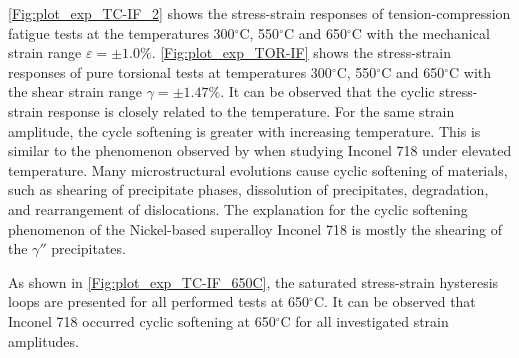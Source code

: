\ref{Fig:plot_exp_TC-IF_2} shows the stress-strain responses of tension-compression fatigue tests at the temperatures 300$^\circ$C, 550$^\circ$C and 650$^\circ$C with the mechanical strain range $\varepsilon=\pm1.0\%$. \ref{Fig:plot_exp_TOR-IF} shows the stress-strain responses of pure torsional tests at temperatures 300$^\circ$C, 550$^\circ$C and 650$^\circ$C with the shear strain range $\gamma=\pm1.47\%$. It can be observed that the cyclic stress-strain response is closely related to the temperature. For the same strain amplitude, the cycle softening is greater with increasing temperature. This is similar to the phenomenon observed by \cite{Fournier1977, Xiao2005,kim1988elevated, Schlesinger2017} when studying Inconel 718 under elevated temperature.
Many microstructural evolutions cause cyclic softening of materials, such as shearing of precipitate phases, dissolution of precipitates, degradation, and rearrangement of dislocations.
The explanation for the cyclic softening phenomenon of the Nickel-based superalloy Inconel 718 is mostly the shearing of the $\gamma ''$ precipitates.

As shown in \ref{Fig:plot_exp_TC-IF_650C}, the saturated stress-strain hysteresis loops are presented for all performed tests at 650$^\circ$C.
It can be observed that Inconel 718 occurred cyclic softening at 650$^\circ$C for all investigated strain amplitudes.


